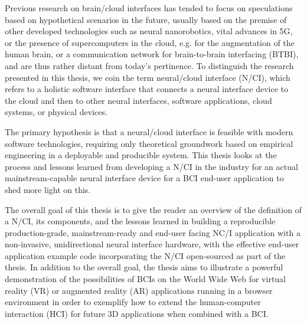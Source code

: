 Previous research on brain/cloud interfaces has tended to focus on speculations based on hypothetical scenarios in the future, usually based on the premise of other developed technologies such as neural nanorobotics, vital advances in 5G, or the presence of supercomputers in the cloud, e.g. for the augmentation of the human brain, or a communication network for brain-to-brain interfacing (BTBI), and are thus rather distant from today's pertinence. To distinguish the research presented in this thesis, we coin the term neural/cloud interface (N/CI), which refers to a holistic software interface that connects a neural interface device to the cloud and then to other neural interfaces, software applications, cloud systems, or physical devices.

The primary hypothesis is that a neural/cloud interface is feasible with modern software technologies, requiring only theoretical groundwork based on empirical engineering in a deployable and producible system. This thesis looks at the process and lessons learned from developing a N/CI in the industry for an actual mainstream-capable neural interface device for a BCI end-user application to shed more light on this.

The overall goal of this thesis is to give the reader an overview of the definition of a N/CI, its components, and the lessons learned in building a reproducible production-grade, mainstream-ready and end-user facing NC/I application with a non-invasive, unidirectional neural interface hardware, with the effective end-user application example code incorporating the N/CI open-sourced as part of the thesis. In addition to the overall goal, the thesis aims to illustrate a powerful demonstration of the possibilities of BCIs on the World Wide Web for virtual reality (VR) or augmented reality (AR) applications running in a browser environment in order to exemplify how to extend the human-computer interaction (HCI) for future 3D applications when combined with a BCI.

